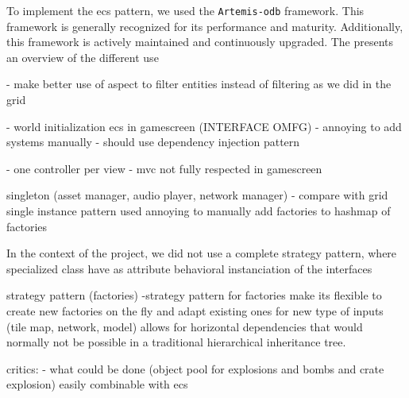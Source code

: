 
To implement the \gls{ecs} pattern, we used the \texttt{Artemis-odb} framework.\cite{artemis-odb} This framework is generally recognized for its performance and maturity. Additionally, this framework is actively maintained and continuously upgraded. The
presents an overview of the different use 

- make better use of aspect to filter entities instead of filtering as we did in the grid

- world initialization ecs in gamescreen (INTERFACE OMFG)
- annoying to add systems manually
- should use dependency injection pattern


- one controller per view
- mvc not fully respected in gamescreen


singleton (asset manager, audio player, network manager)
- compare with grid single instance pattern used
annoying to manually add factories to hashmap of factories


In the context of the project, we did not use a complete strategy pattern, where specialized class have as attribute behavioral instanciation of the interfaces

strategy pattern (factories)
-strategy pattern for factories make its flexible to create new factories on the fly and adapt existing ones for new type of inputs (tile map, network, model) allows for horizontal dependencies that would normally not be possible in a traditional hierarchical inheritance tree.

critics:
- what could be done (object pool for explosions and bombs and crate explosion) easily combinable with ecs
